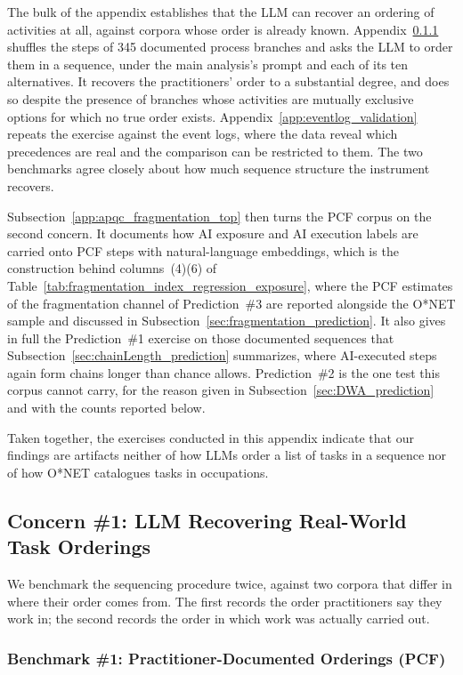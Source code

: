 The bulk of the appendix establishes that the LLM can recover an ordering of activities at all, against corpora
whose order is already known.
Appendix~\ref{app:apqc_validation} shuffles the steps of 345 documented process branches and asks the LLM to
order them in a sequence, under the main analysis's prompt and each of its ten alternatives.
It recovers the practitioners' order to a substantial degree, and does so despite the presence of branches whose activities
are mutually exclusive options for which no true order exists.
Appendix~\ref{app:eventlog_validation} repeats the exercise against the event logs, where the data reveal
which precedences are real and the comparison can be restricted to them.
The two benchmarks agree closely about how much sequence structure the instrument recovers.

Subsection~\ref{app:apqc_fragmentation_top} then turns the PCF corpus on the second concern.
It documents how AI exposure and AI execution labels are carried onto PCF steps with natural-language
embeddings, which is the construction behind columns~(4)\textendash(6) of
Table~\ref{tab:fragmentation_index_regression_exposure}, where the PCF estimates of the fragmentation channel
of Prediction~\#3 are reported alongside the O*NET sample and discussed in
Subsection~\ref{sec:fragmentation_prediction}.
It also gives in full the Prediction~\#1 exercise on those documented sequences that
Subsection~\ref{sec:chainLength_prediction} summarizes, where AI-executed steps again form chains longer
than chance allows.
Prediction~\#2 is the one test this corpus cannot carry, for the reason given in
Subsection~\ref{sec:DWA_prediction} and with the counts reported below.

Taken together, the exercises conducted in this appendix indicate that our findings are artifacts neither of how LLMs
order a list of tasks in a sequence nor of how O*NET catalogues tasks in occupations.

\subsection{Concern \#1: LLM Recovering Real-World Task Orderings}
\label{app:sequencing_validation}

We benchmark the sequencing procedure twice, against two corpora that differ in where their order comes from.
The first records the order practitioners say they work in; the second records the order in which work was
actually carried out.

\subsubsection{Benchmark \#1: Practitioner-Documented Orderings (PCF)}
\label{app:apqc_validation}

